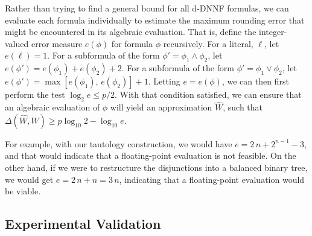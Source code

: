 \documentclass[letterpaper,USenglish,cleveref, autoref, thm-restate]{lipics-v2021}
\newcommand{\lit}{\ell}
\newcommand{\approximate}[1]{\hat{#1}}
\newcommand{\approxW}{\approximate{W}}
\newcommand{\digitprecision}{\Delta}
\begin{document}

Rather than trying to find a general bound for all d-DNNF formulas, we
can evaluate each formula individually to estimate the maximum
rounding error that might be encountered in its algebraic evaluation.  That is,
define the integer-valued error measure $e(\phi)$ for formula $\phi$
recursively.  For a literal, $\lit$, let $e(\lit) = 1$.
For a subformula of the form $\phi' = \phi_1 \land \phi_2$, let $e(\phi') = e(\phi_1) + e(\phi_2) + 2$.
For a subformula of the form $\phi'= \phi_1 \lor \phi_2$, let $e(\phi') = \max[e(\phi_1),\, e(\phi_2)] + 1$.
Letting $e = e(\phi)$, we can then first perform the test $\log_2 e \leq p/2$.  With that condition satisfied,
we can ensure that an algebraic evaluation of $\phi$ will yield an approximation $\approxW$, such that
$\digitprecision(\approxW, W) \geq p \log_{10} 2 - \log_{10} e$.

For example, with our tautology construction, we would have $e = 2\,n
+ 2^{n-1} -3$, and that would indicate that a floating-point
evaluation is not feasible.  On the other hand, if we were to
restructure the disjunctions into a balanced binary tree, we would get
$e = 2\,n + n = 3\,n$, indicating that a floating-point evaluation would
be viable.


\subsection{Experimental Validation}
\end{document}

